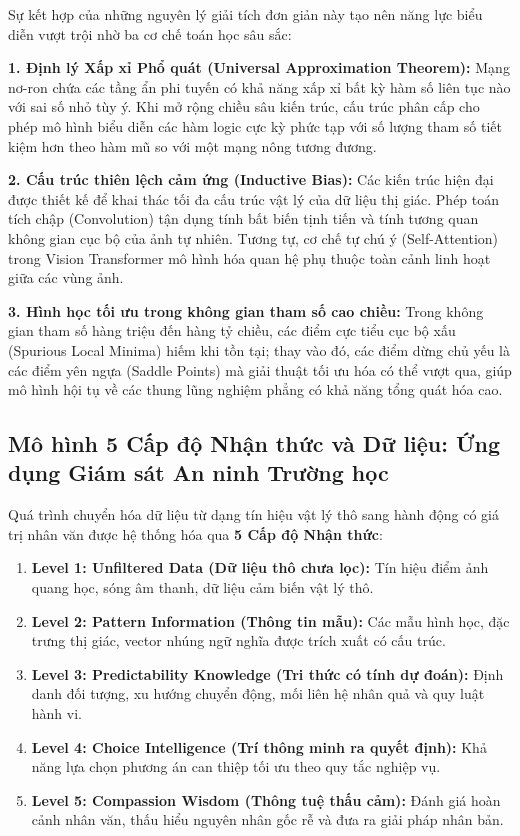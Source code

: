 Sự kết hợp của những nguyên lý giải tích đơn giản này tạo nên năng lực biểu diễn vượt trội nhờ ba cơ chế toán học sâu sắc:

\textbf{1. Định lý Xấp xỉ Phổ quát (Universal Approximation Theorem):} Mạng nơ-ron chứa các tầng ẩn phi tuyến có khả năng xấp xỉ bất kỳ hàm số liên tục nào với sai số nhỏ tùy ý. Khi mở rộng chiều sâu kiến trúc, cấu trúc phân cấp cho phép mô hình biểu diễn các hàm logic cực kỳ phức tạp với số lượng tham số tiết kiệm hơn theo hàm mũ so với một mạng nông tương đương.

\textbf{2. Cấu trúc thiên lệch cảm ứng (Inductive Bias):} Các kiến trúc hiện đại được thiết kế để khai thác tối đa cấu trúc vật lý của dữ liệu thị giác. Phép toán tích chập (Convolution) tận dụng tính bất biến tịnh tiến và tính tương quan không gian cục bộ của ảnh tự nhiên. Tương tự, cơ chế tự chú ý (Self-Attention) trong Vision Transformer mô hình hóa quan hệ phụ thuộc toàn cảnh linh hoạt giữa các vùng ảnh.

\textbf{3. Hình học tối ưu trong không gian tham số cao chiều:} Trong không gian tham số hàng triệu đến hàng tỷ chiều, các điểm cực tiểu cục bộ xấu (Spurious Local Minima) hiếm khi tồn tại; thay vào đó, các điểm dừng chủ yếu là các điểm yên ngựa (Saddle Points) mà giải thuật tối ưu hóa có thể vượt qua, giúp mô hình hội tụ về các thung lũng nghiệm phẳng có khả năng tổng quát hóa cao.

\subsection{Mô hình 5 Cấp độ Nhận thức và Dữ liệu: Ứng dụng Giám sát An ninh Trường học}

Quá trình chuyển hóa dữ liệu từ dạng tín hiệu vật lý thô sang hành động có giá trị nhân văn được hệ thống hóa qua \textbf{5 Cấp độ Nhận thức}:
\begin{enumerate}
    \item \textbf{Level 1: Unfiltered Data (Dữ liệu thô chưa lọc):} Tín hiệu điểm ảnh quang học, sóng âm thanh, dữ liệu cảm biến vật lý thô.
    \item \textbf{Level 2: Pattern Information (Thông tin mẫu):} Các mẫu hình học, đặc trưng thị giác, vector nhúng ngữ nghĩa được trích xuất có cấu trúc.
    \item \textbf{Level 3: Predictability Knowledge (Tri thức có tính dự đoán):} Định danh đối tượng, xu hướng chuyển động, mối liên hệ nhân quả và quy luật hành vi.
    \item \textbf{Level 4: Choice Intelligence (Trí thông minh ra quyết định):} Khả năng lựa chọn phương án can thiệp tối ưu theo quy tắc nghiệp vụ.
    \item \textbf{Level 5: Compassion Wisdom (Thông tuệ thấu cảm):} Đánh giá hoàn cảnh nhân văn, thấu hiểu nguyên nhân gốc rễ và đưa ra giải pháp nhân bản.
\end{enumerate}

